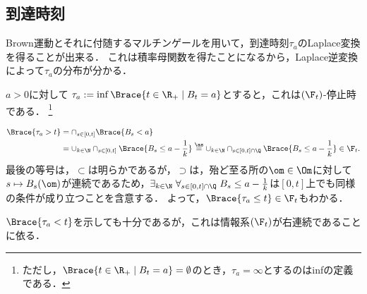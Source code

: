 \documentclass[uplatex,dvipdfmx]{jsreport}
\begin{document}
\subsection{到達時刻}

\begin{tcolorbox}[colframe=ForestGreen, colback=ForestGreen!10!white,breakable,colbacktitle=ForestGreen!40!white,coltitle=black,fonttitle=\bfseries\sffamily,
title=Markov過程の到達時刻はLaplace変換の有名な応用先である]
    Brown運動とそれに付随するマルチンゲールを用いて，到達時刻$\tau_a$のLaplace変換を得ることが出来る．
    これは積率母関数を得たことになるから，Laplace逆変換によって$\tau_a$の分布が分かる．
\end{tcolorbox}

\begin{lemma}[到達時刻]
    $a>0$に対して
    $\tau_a:=\inf\Brace{t\in\R_+\mid B_t=a}$とすると，これは$(\F_t)$-停止時である．
    \footnote{ただし，$\Brace{t\in\R_+\mid B_t=a}=\emptyset$のとき，$\tau_a=\infty$とするのはinfの定義である．}
\end{lemma}
\begin{Proof}
    \begin{align*}
        \Brace{\tau_a>t}&=\cap_{s\in[0,t]}\Brace{B_s<a}\\
        &=\cup_{k\in\N}\cap_{s\in[0,t]}\Brace{B_s\le a-\frac{1}{k}}\overset{\as}{=}\cup_{k\in\N}\cap_{s\in[0,t]\cap\Q}\Brace{B_s\le a-\frac{1}{k}}\in\F_t.
    \end{align*}
    最後の等号は，$\subset$は明らかであるが，$\supset$は，殆ど至る所の$\om\in\Om$に対して$s\mapsto B_s(\om)$が連続であるため，$\exists_{k\in\N}\;\forall_{s\in[0,t]\cap\Q}\;B_s\le a-\frac{1}{k}$は$[0,t]$上でも同様の条件が成り立つことを含意する．
    よって，$\Brace{\tau_a\le t}\in\F_t$もわかる．
\end{Proof}
\begin{remarks}
    $\Brace{\tau_a<t}$を示しても十分であるが，これは情報系$(\F_t)$が右連続であることに依る．
\end{remarks}
\end{document}
